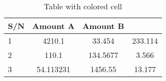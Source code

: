 \documentclass{article}
\begin{document}
	
	\begin{table}
		
		\begin{center}
			
			\caption{Table with colored cell}
			\label{tab:table1}
			\begin{tabular}{l|c|c|c|}
				\hline
				\textbf{S/N} & \textbf{Amount A} & \textbf{Amount B}&\\
				\hline
				\cellcolor{blue!25}1 &4210.1 & 33.454 & 233.114\\
				\cellcolor{green!20}2 & 110.1 & 134.5677 & 3.566\\
				\cellcolor{red!35}3 & 54.113231 & 1456.55 & 13.177\\
				\hline
			\end{tabular}
			
		\end{center}
		
	\end{table}
	
\end{document}
